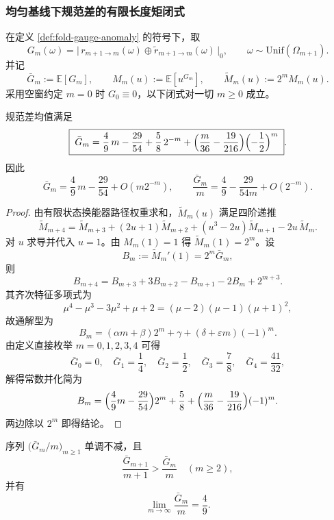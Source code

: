 \subsubsection{均匀基线下规范差的有限长度矩闭式}\label{subsubsec:fold-gauge-anomaly-uniform-finite-moment-closures}
在定义 \ref{def:fold-gauge-anomaly} 的符号下，取
\[
G_m(\omega)=\bigl|\,r_{m+1\to m}(\omega)\oplus \widetilde r_{m+1\to m}(\omega)\,\bigr|_0,\qquad
\omega\sim\mathrm{Unif}(\Omega_{m+1}).
\]
并记
\[
\bar G_m:=\mathbb E[G_m],\qquad
M_m(u):=\mathbb E[u^{G_m}],\qquad
\widetilde M_m(u):=2^m M_m(u).
\]
采用空窗约定 \(m=0\) 时 \(G_0\equiv 0\)，以下闭式对一切 \(m\ge 0\) 成立。

\begin{theorem}[均值的精确有限长度闭式]\label{thm:fold-gauge-anomaly-mean-finite-closed}
规范差均值满足
\[
\boxed{\;
\bar G_m
=\frac49\,m-\frac{29}{54}
+\frac58\,2^{-m}
+\Bigl(\frac{m}{36}-\frac{19}{216}\Bigr)\Bigl(-\frac12\Bigr)^m
\; }.
\]
因此
\[
\bar G_m=\frac49\,m-\frac{29}{54}+O(m2^{-m}),
\qquad
\frac{\bar G_m}{m}=\frac49-\frac{29}{54m}+O(2^{-m}).
\]
\end{theorem}

\begin{proof}
由有限状态换能器路径权重求和，\(\widetilde M_m(u)\) 满足四阶递推
\[
\widetilde M_{m+4}
=\widetilde M_{m+3}+(2u+1)\widetilde M_{m+2}+(u^3-2u)\widetilde M_{m+1}-2u\,\widetilde M_m.
\]
对 \(u\) 求导并代入 \(u=1\)。由 \(M_m(1)=1\) 得 \(\widetilde M_m(1)=2^m\)。设
\[
B_m:=\widetilde M_m'(1)=2^m\bar G_m,
\]
则
\[
B_{m+4}=B_{m+3}+3B_{m+2}-B_{m+1}-2B_m+2^{m+3}.
\]
其齐次特征多项式为
\[
\mu^4-\mu^3-3\mu^2+\mu+2=(\mu-2)(\mu-1)(\mu+1)^2,
\]
故通解型为
\[
B_m=(\alpha m+\beta)2^m+\gamma+(\delta+\varepsilon m)(-1)^m.
\]
由定义直接枚举 \(m=0,1,2,3,4\) 可得
\[
\bar G_0=0,\quad
\bar G_1=\frac14,\quad
\bar G_2=\frac12,\quad
\bar G_3=\frac78,\quad
\bar G_4=\frac{41}{32},
\]
解得常数并化简为
\[
B_m=\Bigl(\frac49m-\frac{29}{54}\Bigr)2^m+\frac58+\Bigl(\frac{m}{36}-\frac{19}{216}\Bigr)(-1)^m.
\]
两边除以 \(2^m\) 即得结论。
\end{proof}

\begin{proposition}[均值密度的全局单调性]\label{prop:fold-gauge-anomaly-mean-density-monotone}
序列 \(\bigl(\bar G_m/m\bigr)_{m\ge 1}\) 单调不减，且
\[
\frac{\bar G_{m+1}}{m+1}>\frac{\bar G_m}{m}\quad(m\ge 2),
\]
并有
\[
\lim_{m\to\infty}\frac{\bar G_m}{m}=\frac49.
\]
\end{proposition}

